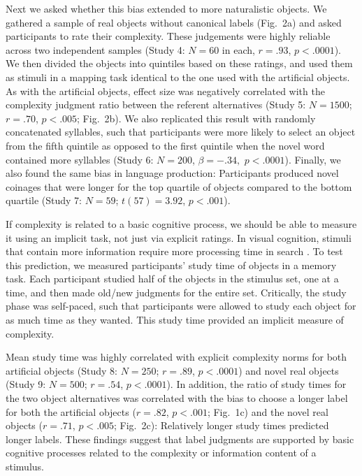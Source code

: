 \documentclass[12pt]{article}
\begin{document}
Next we asked whether this bias extended to more naturalistic objects. We gathered a sample of real objects without canonical labels (Fig.\ 2a) and asked participants to rate their complexity. These judgements were highly reliable across two independent samples (Study 4: $N = 60$ in each, $r = .93$, $p < .0001$). We then divided the objects into quintiles based on these ratings, and used them as stimuli in a mapping task identical to the one used with the artificial objects. As with the artificial objects, effect size was negatively correlated with the complexity judgment ratio between the referent alternatives (Study 5: $N = 1500$; $r = .70$, $p < .005$; Fig.\ 2b). We also replicated this result with randomly concatenated syllables, such that participants were more likely to select an object from the fifth quintile as opposed to the first quintile when the novel word contained more syllables (Study 6: $N=200$, $\beta=-.34,$ $p <.0001$). Finally, we  also found the same bias in language production: Participants produced novel coinages that were longer for the top quartile of objects compared to the bottom quartile (Study 7: $N=59$; $t(57) = 3.92$, $p < .001$). 
					
If complexity is related to a basic cognitive process, we should be able to measure it using an implicit task, not just via explicit ratings. In visual cognition, stimuli that contain more information require more processing time in search \cite{alvarez2004capacity, hyman}. To test this prediction, we measured participants' study time of objects in a memory task. Each participant studied half of the objects in the stimulus set, one at a time, and then made old/new judgments for the entire set. Critically, the study phase was self-paced, such that participants were allowed to study each object for as much time as they wanted. This study time provided an implicit measure of complexity.
					
Mean study time was highly correlated with explicit complexity norms for both artificial objects (Study 8: $N = 250$; $r = .89$, $p < .0001$) and novel real objects (Study 9: $N = 500$; $r = .54$, $p < .0001$). In addition, the ratio of study times for the two object alternatives was correlated with the bias to choose a longer label for both the artificial objects ($r = .82$, $p < .001$; Fig.\ 1c) and the novel real objects ($r = .71$, $p < .005$; Fig.\ 2c): Relatively longer study times predicted longer labels. These findings suggest that label judgments are supported by basic cognitive processes related to the complexity or information content of a stimulus. 
					
\end{document}

